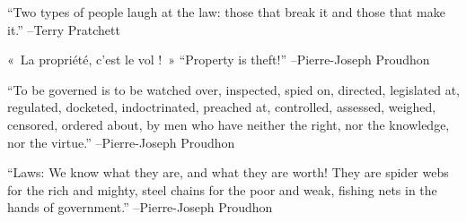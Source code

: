 \documentclass{article}%
\begin{document}
\linebreak%
\vspace{1mm}%
\begin{minipage}{\textwidth}%
\flushleft%
“Two types of people laugh at the law: those that break it and those that make it.”%
\linebreak%
\vspace{1mm}%
–Terry Pratchett%
\linebreak%
\vspace{1mm}%
\end{minipage}%
\linebreak%
\vspace{1mm}%
\begin{minipage}{\textwidth}%
\flushleft%
«~La propriété, c'est le vol !~»%
\linebreak%
\vspace{1mm}%
“Property is theft!”%
\linebreak%
–Pierre{-}Joseph Proudhon%
\linebreak%
\vspace{1mm}%
\end{minipage}%
\linebreak%
\vspace{1mm}%
\begin{minipage}{\textwidth}%
\flushleft%
“To be governed is to be watched over, inspected, spied on, directed, legislated at, regulated, docketed, indoctrinated, preached at, controlled, assessed, weighed, censored, ordered about, by men who have neither the right, nor the knowledge, nor the virtue.”%
\linebreak%
\vspace{1mm}%
–Pierre{-}Joseph Proudhon%
\linebreak%
\vspace{1mm}%
\end{minipage}%
\linebreak%
\vspace{1mm}%
\begin{minipage}{\textwidth}%
\flushleft%
“Laws: We know what they are, and what they are worth! They are spider webs for the rich and mighty, steel chains for the poor and weak, fishing nets in the hands of government.”%
\linebreak%
\vspace{1mm}%
–Pierre{-}Joseph Proudhon%
\linebreak%
\vspace{1mm}%
\end{minipage}%
\linebreak%
\end{document}
